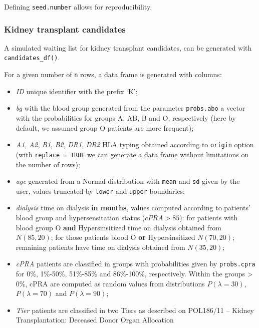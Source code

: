 \documentclass[
]{article}
\providecommand{\tightlist}{%
  \setlength{\itemsep}{0pt}\setlength{\parskip}{0pt}}
\begin{document}
Defining \texttt{seed.number} allows for reproducibility.

\hypertarget{kidney-transplant-candidates}{%
\subsubsection{Kidney transplant
candidates}\label{kidney-transplant-candidates}}

A simulated waiting list for kidney transplant candidates, can be
generated with \texttt{candidates\_df()}.

For a given number of \texttt{n} rows, a data frame is generated with
columns:

\begin{itemize}
\tightlist
\item
  \emph{ID} unique identifier with the prefix `K';
\item
  \emph{bg} with the blood group generated from the parameter
  \texttt{probs.abo} a vector with the probabilities for groups A, AB, B
  and O, respectively (here by default, we assumed group O patients are
  more frequent);
\item
  \emph{A1}, \emph{A2}, \emph{B1}, \emph{B2}, \emph{DR1}, \emph{DR2} HLA
  typing obtained according to \texttt{origin} option (with
  \texttt{replace\ =\ TRUE} we can generate a data frame without
  limitations on the number of rows);
\item
  \emph{age} generated from a Normal distribution with \texttt{mean} and
  \texttt{sd} given by the user, values truncated by \texttt{lower} and
  \texttt{upper} boundaries;
\item
  \emph{dialysis} time on dialysis \textbf{in months}, values computed
  according to patients' blood group and hypersensitation status
  (\(cPRA > 85%
  \)): for patients with blood group O \textbf{and} Hypersinsitized time
  on dialysis obtained from \(N(85, 20)\); for those patients blood O
  \textbf{or} Hypersinsitized \(N(70,20)\); remaining patients have time
  on dialysis obtained from \(N(35,20)\);
\item
  \emph{cPRA} patients are classified in groups with probabilities given
  by \texttt{probs.cpra} for 0\%, 1\%-50\%, 51\%-85\% and 86\%-100\%,
  respectively. Within the groups \textgreater{} 0\%, cPRA are computed
  as random values from distributions \(P(\lambda = 30)\),
  \(P(\lambda = 70)\) and \(P(\lambda = 90)\);
\item
  \emph{Tier} patients are classified in two Tiers as described on
  POL186/11 -- Kidney Transplantation: Deceased Donor Organ Allocation

\end{itemize}
\end{document}
